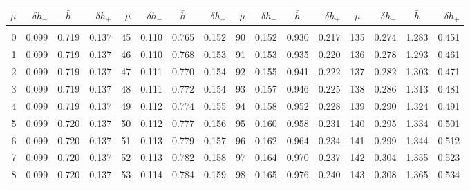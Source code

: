 \clearpage
\begin{table}[!h]\centering
\vspace{0.25cm}
\scriptsize{ \begin{tabular}{rrrr|rrrr|rrrr|crrr}
$\mu$ & $\delta h_-$  & $\bar{h}~~~~$ & $\delta h_+$ &
$\mu$ & $\delta h_-$  & $\bar{h}~~~~$ & $\delta h_+$ &
$\mu$ & $\delta h_-$  & $\bar{h}~~~~$ & $\delta h_+$ &
$\mu$ & $\delta h_-$  & $\bar{h}~~~~$ & $\delta h_+$ \\\hline
&&&&&&&&&&&&&&&\\[-1.75ex]
  0 & \tiny{  0.099} &   0.719 & \tiny{  0.137} &  45 & \tiny{  0.110} &   0.765 & \tiny{  0.152} &  90 & \tiny{  0.152} &   0.930 & \tiny{  0.217} & 135 & \tiny{  0.274} &   1.283 & \tiny{  0.451}\\
  1 & \tiny{  0.099} &   0.719 & \tiny{  0.137} &  46 & \tiny{  0.110} &   0.768 & \tiny{  0.153} &  91 & \tiny{  0.153} &   0.935 & \tiny{  0.220} & 136 & \tiny{  0.278} &   1.293 & \tiny{  0.461}\\
  2 & \tiny{  0.099} &   0.719 & \tiny{  0.137} &  47 & \tiny{  0.111} &   0.770 & \tiny{  0.154} &  92 & \tiny{  0.155} &   0.941 & \tiny{  0.222} & 137 & \tiny{  0.282} &   1.303 & \tiny{  0.471}\\
  3 & \tiny{  0.099} &   0.719 & \tiny{  0.137} &  48 & \tiny{  0.111} &   0.772 & \tiny{  0.154} &  93 & \tiny{  0.157} &   0.946 & \tiny{  0.225} & 138 & \tiny{  0.286} &   1.313 & \tiny{  0.481}\\
  4 & \tiny{  0.099} &   0.719 & \tiny{  0.137} &  49 & \tiny{  0.112} &   0.774 & \tiny{  0.155} &  94 & \tiny{  0.158} &   0.952 & \tiny{  0.228} & 139 & \tiny{  0.290} &   1.324 & \tiny{  0.491}\\
  5 & \tiny{  0.099} &   0.720 & \tiny{  0.137} &  50 & \tiny{  0.112} &   0.777 & \tiny{  0.156} &  95 & \tiny{  0.160} &   0.958 & \tiny{  0.231} & 140 & \tiny{  0.295} &   1.334 & \tiny{  0.501}\\
  6 & \tiny{  0.099} &   0.720 & \tiny{  0.137} &  51 & \tiny{  0.113} &   0.779 & \tiny{  0.157} &  96 & \tiny{  0.162} &   0.964 & \tiny{  0.234} & 141 & \tiny{  0.299} &   1.344 & \tiny{  0.512}\\
  7 & \tiny{  0.099} &   0.720 & \tiny{  0.137} &  52 & \tiny{  0.113} &   0.782 & \tiny{  0.158} &  97 & \tiny{  0.164} &   0.970 & \tiny{  0.237} & 142 & \tiny{  0.304} &   1.355 & \tiny{  0.523}\\
  8 & \tiny{  0.099} &   0.720 & \tiny{  0.137} &  53 & \tiny{  0.114} &   0.784 & \tiny{  0.159} &  98 & \tiny{  0.165} &   0.976 & \tiny{  0.240} & 143 & \tiny{  0.308} &   1.365 & \tiny{  0.534}\\

\end{tabular}}
\end{table}

